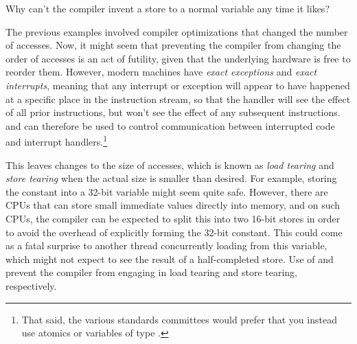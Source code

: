 \QuickQuiz{}
	Why can't the compiler invent a store to a normal variable
	any time it likes?
 \QuickQuizEnd

The previous examples involved compiler optimizations that
changed the number of accesses.
Now, it might seem that preventing the compiler from changing the
order of accesses is an act of futility, given that the underlying
hardware is free to reorder them.
However, modern machines have \emph{exact exceptions} and
\emph{exact interrupts}, meaning that any interrupt or exception will
appear to have happened at a specific place in the instruction
stream, so that the handler will see the effect of all prior
instructions, but won't see the effect of any subsequent instructions.
 and  can therefore be used to
control communication between interrupted code and interrupt handlers.\footnote{
	That said, the various standards committees would prefer that
	you instead use atomics or variables of type .}

This leaves changes to the size of accesses, which is known as
\emph{load tearing} and \emph{store tearing} when the actual size
is smaller than desired.
For example, storing the constant  into a 32-bit
variable might seem quite safe.
However, there are CPUs that can store small immediate values
directly into memory, and on such CPUs, the compiler can be expected
to split this into two 16-bit stores in order to avoid the overhead
of explicitly forming the 32-bit constant.
This could come as a fatal surprise to another thread concurrently
loading from this variable, which might not expect to see the
result of a half-completed store.
Use of  and  prevent the compiler
from engaging in load tearing and store tearing, respectively.

